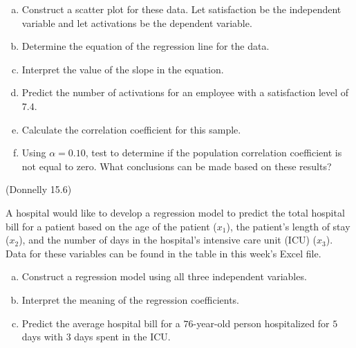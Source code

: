 \documentclass[12pt, letterpaper]{article}
\newcounter{exercise}
\theoremstyle{definition}
\begin{document}
\begin{enumerate}[(a)]

\item Construct a scatter plot for these data.  Let satisfaction be the independent variable and let activations be the dependent variable.

\vfill

\item Determine the equation of the regression line for the data.

\vfill

\item Interpret the value of the slope in the equation.

\vfill

\item Predict the number of activations for an employee with a satisfaction level of $7.4$.

\vfill

\item Calculate the correlation coefficient for this sample.

\vfill

\item Using $\alpha = 0.10$, test to determine if the population correlation coefficient is not equal to zero.  What conclusions can be made based on these results?

\vfill

\end{enumerate}

\newpage

\begin{exercise}  (Donnelly 15.6)

A hospital would like to develop a regression model to predict the total hospital bill for a patient based on the age of the patient ($x_1$), the patient's length of stay ($x_2$), and the number of days in the hospital's intensive care unit (ICU) ($x_3$).  Data for these variables can be found in the table in this week's Excel file.

\end{exercise}

\begin{enumerate}[(a)]

\item Construct a regression model using all three independent variables.

\vfill

\item Interpret the meaning of the regression coefficients.

\vfill

\item Predict the average hospital bill for a $76$-year-old person hospitalized for $5$ days with $3$ days spent in the ICU.

\vfill

\end{enumerate}
\end{document}

